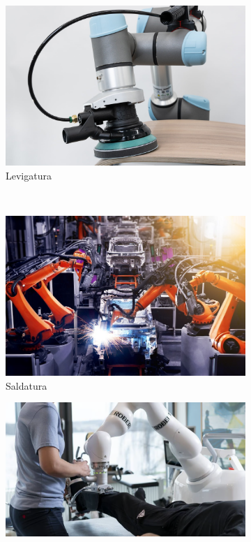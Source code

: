 \begin{figure}[H]
    \centering
    \begin{subfigure}[b]{0.33\textwidth}
        \includegraphics[width=\textwidth]{images/polishing.jpg}
        \caption{Levigatura}
        \label{fig:polishing}
    \end{subfigure}
    ~ %
    \begin{subfigure}[b]{0.33\textwidth}
        \includegraphics[width=\textwidth]{images/welding.jpeg}
        \caption{Saldatura}
        \label{fig:welding}
    \end{subfigure}
    \begin{subfigure}[b]{0.33\textwidth}
        \includegraphics[width=\textwidth]{images/rehabilitation.png}

\end{subfigure}
\end{figure}
